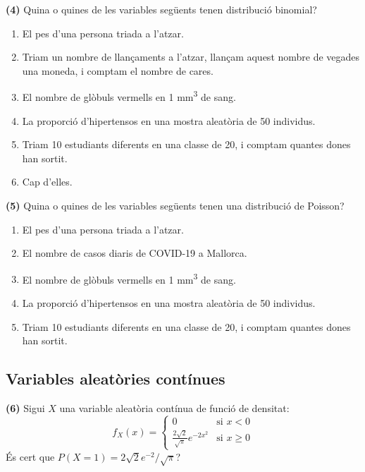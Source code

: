 \documentclass[
]{book}
\providecommand{\tightlist}{%
  \setlength{\itemsep}{0pt}\setlength{\parskip}{0pt}}
\renewcommand{\geq}{\geqslant}
\theoremstyle{definition}
\theoremstyle{definition}
\theoremstyle{definition}
\theoremstyle{remark}
\begin{document}
\textbf{(4)} Quina o quines de les variables següents tenen distribució binomial?

\begin{enumerate}
\def\labelenumi{\arabic{enumi}.}
\tightlist
\item
  El pes d'una persona triada a l'atzar.
\item
  Triam un nombre de llançaments a l'atzar, llançam aquest nombre de vegades una moneda, i comptam el nombre de cares.
\item
  El nombre de glòbuls vermells en 1 mm\textsuperscript{3} de sang.
\item
  La proporció d'hipertensos en una mostra aleatòria de 50 individus.
\item
  Triam 10 estudiants diferents en una classe de 20, i comptam quantes dones han sortit.
\item
  Cap d'elles.
\end{enumerate}

\textbf{(5)} Quina o quines de les variables següents tenen una distribució de Poisson?

\begin{enumerate}
\def\labelenumi{\arabic{enumi}.}
\tightlist
\item
  El pes d'una persona triada a l'atzar.
\item
  El nombre de casos diaris de COVID-19 a Mallorca.
\item
  El nombre de glòbuls vermells en 1 mm\textsuperscript{3} de sang.
\item
  La proporció d'hipertensos en una mostra aleatòria de 50 individus.
\item
  Triam 10 estudiants diferents en una classe de 20, i comptam quantes dones han sortit.
\end{enumerate}

\hypertarget{variables-aleatuxf2ries-contuxednues-1}{%
\subsection{Variables aleatòries contínues}\label{variables-aleatuxf2ries-contuxednues-1}}

\textbf{(6)} Sigui \(X\) una variable aleatòria contínua de funció de densitat:
\[
f_X(x)=\left\{\begin{array}{ll}
0 & \mbox{si $x<0$}\\
\frac{2\sqrt{2}}{\sqrt{\pi}} e^{-2x^2} & \mbox{si $x\geq 0$}
\end{array}
\right.
\]
És cert que \(P(X=1)=2\sqrt{2}e^{-2}/\sqrt{\pi}\)?
\end{document}
